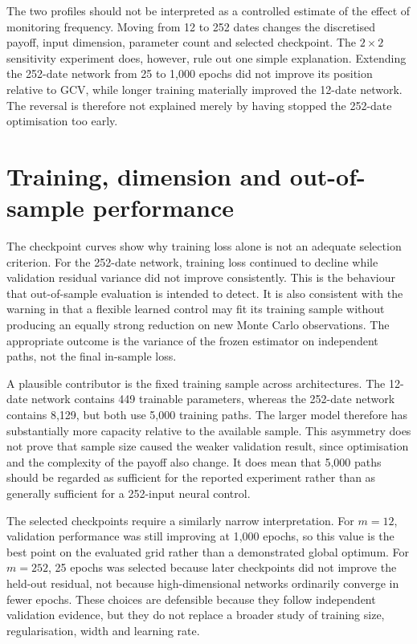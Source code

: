 The two profiles should not be interpreted as a controlled estimate of the effect of monitoring frequency. Moving from 12 to 252 dates changes the discretised payoff, input dimension, parameter count and selected checkpoint. The $2 \times 2$ sensitivity experiment does, however, rule out one simple explanation. Extending the 252-date network from 25 to 1{,}000 epochs did not improve its position relative to GCV, while longer training materially improved the 12-date network. The reversal is therefore not explained merely by having stopped the 252-date optimisation too early.

\section{Training, dimension and out-of-sample performance}

The checkpoint curves show why training loss alone is not an adequate selection criterion. For the 252-date network, training loss continued to decline while validation residual variance did not improve consistently. This is the behaviour that out-of-sample evaluation is intended to detect. It is also consistent with the warning in \textcite{wan_zhong_xiong_zhu_2020} that a flexible learned control may fit its training sample without producing an equally strong reduction on new Monte Carlo observations. The appropriate outcome is the variance of the frozen estimator on independent paths, not the final in-sample loss.

A plausible contributor is the fixed training sample across architectures. The 12-date network contains 449 trainable parameters, whereas the 252-date network contains 8{,}129, but both use 5{,}000 training paths. The larger model therefore has substantially more capacity relative to the available sample. This asymmetry does not prove that sample size caused the weaker validation result, since optimisation and the complexity of the payoff also change. It does mean that 5{,}000 paths should be regarded as sufficient for the reported experiment rather than as generally sufficient for a 252-input neural control.

The selected checkpoints require a similarly narrow interpretation. For $m = 12$, validation performance was still improving at 1{,}000 epochs, so this value is the best point on the evaluated grid rather than a demonstrated global optimum. For $m = 252$, 25 epochs was selected because later checkpoints did not improve the held-out residual, not because high-dimensional networks ordinarily converge in fewer epochs. These choices are defensible because they follow independent validation evidence, but they do not replace a broader study of training size, regularisation, width and learning rate.

